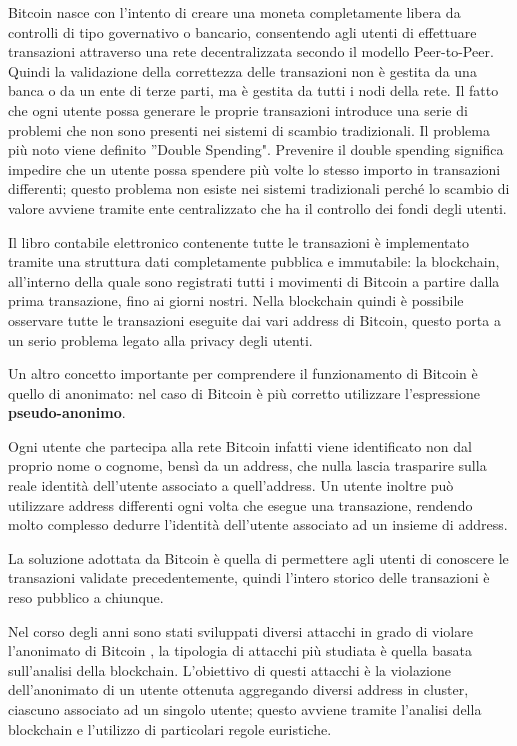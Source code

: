 Bitcoin nasce con l'intento di creare una moneta completamente libera da controlli di tipo governativo o bancario, consentendo agli utenti di effettuare transazioni attraverso una rete decentralizzata secondo il modello Peer-to-Peer. Quindi la validazione della correttezza delle transazioni non è gestita da una banca o da un ente di terze parti, ma è gestita da tutti i nodi della rete. Il fatto che ogni utente possa generare le proprie transazioni introduce una serie di problemi che non sono presenti nei sistemi di scambio tradizionali. Il problema più noto viene definito ''Double Spending". Prevenire il double spending significa impedire che un utente possa spendere più volte lo stesso importo in transazioni differenti; questo problema non esiste nei sistemi tradizionali perché lo scambio di valore avviene tramite ente centralizzato che ha il controllo dei fondi degli utenti. 

Il libro contabile elettronico contenente tutte le transazioni è implementato tramite una struttura dati completamente pubblica e immutabile: la blockchain, all’interno della quale sono registrati tutti i movimenti di Bitcoin a partire dalla prima transazione, fino ai giorni nostri. Nella blockchain quindi è possibile osservare tutte le transazioni eseguite dai vari address di Bitcoin, questo porta a un serio problema legato alla privacy degli utenti. 

Un altro concetto importante per comprendere il funzionamento di Bitcoin è quello di anonimato: nel caso di Bitcoin è più corretto utilizzare l’espressione \textbf{pseudo-anonimo}.

Ogni utente che partecipa alla rete Bitcoin infatti viene identificato non dal proprio nome o cognome, bensì da un address, che nulla lascia trasparire sulla reale identità dell'utente associato a quell'address. Un utente inoltre può utilizzare address differenti ogni volta che esegue una transazione, rendendo molto complesso dedurre l'identità dell'utente associato ad un insieme di address.

La soluzione adottata da Bitcoin è quella di permettere agli utenti di conoscere le transazioni validate precedentemente, quindi l'intero storico delle transazioni è reso pubblico a chiunque.

Nel corso degli anni sono stati sviluppati diversi attacchi in grado di violare l'anonimato di Bitcoin \cite{de-anonimizzazione}, la tipologia di attacchi più studiata è quella basata sull'analisi della blockchain. L'obiettivo di questi attacchi è la violazione dell'anonimato di un utente ottenuta aggregando diversi address in cluster, ciascuno associato ad un singolo utente; questo avviene tramite l'analisi della blockchain e l'utilizzo di particolari regole euristiche.

